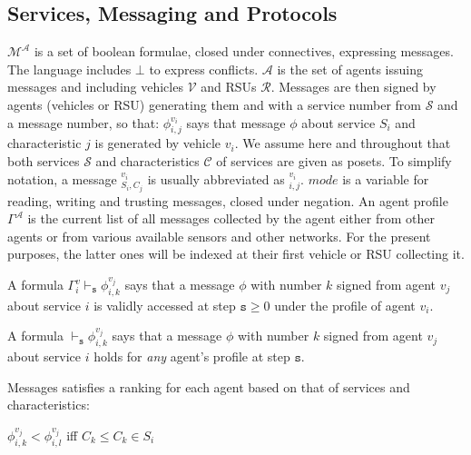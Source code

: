 \documentclass[]{llncs}
\begin{document}
\subsection{Services, Messaging and Protocols}

$\mathcal{M^{\mathcal{A}}}$ is a set of boolean formulae, closed under connectives, expressing messages. The language includes $\bot$ to express conflicts. $\mathcal{A}$ is the set of agents issuing messages and including vehicles $\mathcal{V}$ and RSUs $\mathcal{R}$. Messages are then signed by agents (vehicles or RSU) generating them and with a service number from $\mathcal{S}$ and a message number, so that: $\phi^{v_{i}}_{i,j}$ says that message $\phi$ about service $S_{i}$ and characteristic $j$ is generated by vehicle $v_{i}$. We assume here and throughout that both services $\mathcal{S}$ and characteristics $\mathcal{C}$ of services are given as posets. To simplify notation, a message $^{v_{i}}_{S_{i},C_{j}}$ is usually abbreviated as $^{v_{i}}_{{i},{j}}$. $mode$ is a variable for reading, writing and trusting messages, closed under negation. An agent profile $\Gamma^{\mathcal{A}}$ is the current list of all messages collected by the agent either from other agents or from various available sensors and other networks. For the present purposes, the latter ones will be indexed at their first vehicle or RSU collecting it.


\begin{definition}[Formulas]
A formula $\Gamma^{v}_{i} \vdash_{\mathtt{s}} \phi^{v_{j}}_{i,k}$ says that a message $\phi$ with number $k$ signed from agent $v_{j}$ about service $i$ is validly accessed at step $\mathtt{s}\geq 0$ under the profile of agent $v_{i}$.
\end{definition}

\begin{definition}[Validity]
A formula $\vdash_{\mathtt{s}} \phi^{v_{j}}_{i,k}$ says that a message $\phi$ with number $k$ signed from agent $v_{j}$ about service $i$ holds for \textit{any} agent's profile at step $\mathtt{s}$.
\end{definition}


Messages satisfies a ranking for each agent based on that of services and characteristics:

\begin{definition}\label{def:dependencypackages}
$\phi^{v_{j}}_{i,k}<\phi^{v_{j}}_{i,l}$ iff $C_{k}\leq C_{k} \in S_{i}$ 
%
\end{definition}
\end{document}
